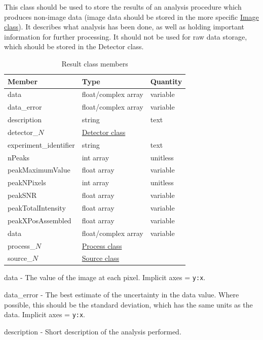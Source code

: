 \documentclass[usletter,11pt]{article}
\newcommand{\member}[2]
{ \noindent
{ \color{softBlue}  #1 - } #2
\vspace{0.2cm}
}
\begin{document}
This class should be used to store the results of an analysis procedure which
produces non-image data (image data should be stored in the more specific
\hyperref[table:image]{Image class}). It describes what analysis has been done,
as well as holding important information for further processing. It should not
be used for raw data storage, which should be stored in the Detector class.

\begin{table}[h!]\sffamily \footnotesize
\caption{Result class members}

\begin{tabular}{p{4.5cm} p{4.5cm}  p{2.5cm} }

\toprule
\bfseries Member     & \bfseries Type & \bfseries Quantity \\
\midrule
data &  float/complex array & variable \\
data\_error & float/complex array & variable \\
description & string & text \\
detector\_$N$ &  \hyperref[table:detector]{Detector class} & \\
experiment\_identifier & string  & text \\
nPeaks & int array & unitless \\
peakMaximumValue & float array & variable \\
peakNPixels & int array & unitless \\
peakSNR & float array & variable \\
peakTotalIntensity & float array & variable \\
peakXPosAssembled & float array & variable \\
data &  float/complex array & variable \\
process\_$N$ &  \hyperref[table:process]{Process class} & \\
source\_$N$ &  \hyperref[table:source]{Source class} & \\
\bottomrule
\end{tabular}
\end{table}

\member{data}{The value of the image at each pixel. Implicit axes = {\tt y:x}.}

\member{data\_error}{The best estimate of the uncertainty in the data
 value. Where possible, this should be the standard deviation, which
 has the same units as the data. Implicit axes = {\tt y:x}.}

\member{description}{Short description of the analysis performed.}
\end{document}
